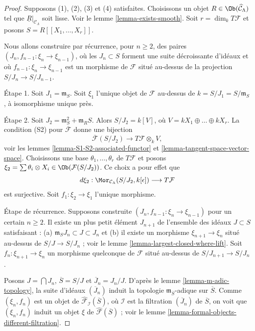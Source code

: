 \begin{proof}
Supposons (1), (2), (3) et (4) satisfaites. Choisissons un objet
$R \in \Ob(\widehat{\mathcal{C}}_\Lambda)$ tel que
$\underline{R}|_{\mathcal{C}_\Lambda}$ soit lisse. Voir le lemme
\ref{lemma-exists-smooth}. Soit $r = \dim_k T\mathcal{F}$ et posons
$S = R[[X_1, \ldots, X_r]]$.

\medskip\noindent
Nous allons construire par récurrence, pour $n \geq 2$, des paires
$(J_n, f_{n - 1} : \xi_n \to \xi_{n - 1})$, où les $J_n \subset S$ forment
une suite décroissante d'idéaux et où
$f_{n - 1} : \xi_n \to \xi_{n - 1}$ est un morphisme de $\mathcal{F}$ situé
au-dessus de la projection $S/J_n \to S/J_{n - 1}$.

\medskip\noindent
Étape 1. Soit $J_1 = \mathfrak m_S$. Soit $\xi_1$ l'unique objet de
$\mathcal{F}$ au-dessus de $k = S/J_1 = S/\mathfrak m_S$, à isomorphisme
unique près.

\medskip\noindent
Étape 2. Soit $J_2 = \mathfrak m_S^2 + \mathfrak{m}_R S$. Alors
$S/J_2 = k[V]$, où $V = kX_1 \oplus \ldots \oplus kX_r$. La condition (S2)
pour $\overline{\mathcal{F}}$ donne une bijection
$$
\overline{\mathcal{F}}(S/J_2)
\longrightarrow
T\mathcal{F} \otimes_k V,
$$
voir les lemmes \ref{lemma-S1-S2-associated-functor} et
\ref{lemma-tangent-space-vector-space}. Choisissons une base
$\theta_1, \ldots, \theta_r$ de $T\mathcal{F}$ et posons
$\xi_2 = \sum \theta_i \otimes X_i \in \Ob(\mathcal{F}(S/J_2))$. Ce choix a
pour effet que
$$
d\xi_2 :
\Mor_{\mathcal{C}_\Lambda}(S/J_2, k[\epsilon])
\longrightarrow
T\mathcal{F}
$$
est surjective. Soit $f_1 : \xi_2 \to \xi_1$ l'unique morphisme.

\medskip\noindent
Étape de récurrence. Supposons construite
$(J_n, f_{n - 1} : \xi_n \to \xi_{n - 1})$ pour un certain $n \geq 2$. Il
existe un plus petit élément $J_{n + 1}$ de l'ensemble des idéaux
$J \subset S$ satisfaisant : (a) $\mathfrak m_S J_n \subset J \subset J_n$
et (b) il existe un morphisme $\xi_{n + 1} \to \xi_n$ situé au-dessus de
$S/J \to S/J_n$ ; voir le lemme \ref{lemma-largest-closed-where-lift}. Soit
$f_n : \xi_{n + 1} \to \xi_n$ un morphisme quelconque de $\mathcal{F}$ situé
au-dessus de $S/J_{n + 1} \to S/J_n$.

\medskip\noindent
Posons $J = \bigcap J_n$, $\overline{S} = S/J$ et
$\overline{J}_n = J_n/J$. D'après le lemme \ref{lemma-m-adic-topology}, la
suite d'idéaux $(\overline{J}_n)$ induit la topologie
$\mathfrak m_{\overline{S}}$-adique sur $\overline{S}$. Comme
$(\xi_n, f_n)$ est un objet de
$\widehat{\mathcal{F}}_\mathcal{I}(\overline{S})$, où $\mathcal{I}$ est la
filtration $(\overline{J}_n)$ de $\overline{S}$, on voit que
$(\xi_n, f_n)$ induit un objet $\xi$ de
$\widehat{\mathcal{F}}(\overline{S})$ ; voir le lemme
\ref{lemma-formal-objects-different-filtration}.


\end{proof}
